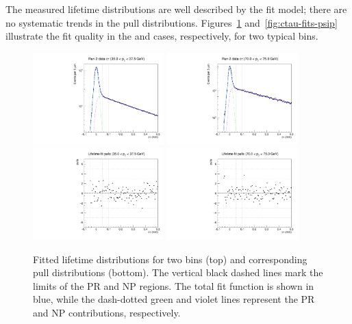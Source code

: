 \vfill\newpage

The measured lifetime distributions are well described by the fit model;
there are no systematic trends in the pull distributions. 
Figures~\ref{fig:ctau-fits-psi} and~\ref{fig:ctau-fits-psip}
illustrate the fit quality in the \jpsi and \psip cases, respectively, 
for two typical \pt bins.

\begin{figure}[t]
\centering
\includegraphics[width=0.45\textwidth]{Figures/chapter4/ltfit_pt4.pdf}
\includegraphics[width=0.45\textwidth]{Figures/chapter4/ltfit_pt14.pdf}\\
\includegraphics[width=0.45\textwidth]{Figures/chapter4/ltpulls_pt4.pdf}
\includegraphics[width=0.45\textwidth]{Figures/chapter4/ltpulls_pt14.pdf}
\caption{Fitted \jpsi lifetime distributions for two \pt bins (top) 
and corresponding pull distributions (bottom).
The vertical black dashed lines mark the limits of the PR and NP regions. 
The total fit function is shown in blue, 
while the dash-dotted green and violet lines 
represent the PR and NP contributions, respectively.}
\label{fig:ctau-fits-psi}
\end{figure}

